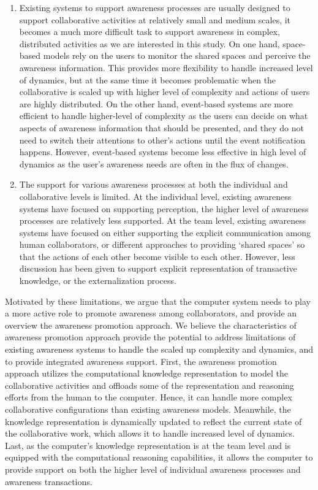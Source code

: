 \begin{enumerate}
   \item Existing systems to support awareness processes are usually designed to support collaborative activities at relatively small and medium scales, it becomes a much more difficult task to support awareness in complex, distributed activities as we are interested in this study. On one hand, space-based models rely on the users to monitor the shared spaces and perceive the awareness information. This provides more flexibility to handle increased level of dynamics, but at the same time it becomes  problematic when the collaborative is scaled up with higher level of complexity and actions of users are highly distributed. On the other hand, event-based systems are more efficient to handle higher-level of complexity as the users can decide on what aspects of awareness information that should be presented, and they do not need to switch their attentions to other's actions until the event notification happens. However, event-based systems become less effective in high level of dynamics as the user's awareness needs are often in the flux of changes.
   \item The support for various awareness processes at both the individual and collaborative levels is limited. At the individual level, existing awareness systems have focused on supporting perception, the higher level of awareness processes are relatively less supported. At the team level, existing awareness systems have focused on either supporting the explicit communication among human collaborators, or different approaches to providing `shared spaces' so that the actions of each other become visible to each other. However, less discussion has been given to support explicit representation of transactive knowledge, or the externalization process.
\end{enumerate}

Motivated by these limitations, we argue that the computer system needs to play a more active role to promote awareness among collaborators, and provide an overview the awareness promotion approach. We believe the characteristics of awareness promotion approach provide the potential to address limitations of existing awareness systems to handle the scaled up complexity and dynamics, and to provide integrated awareness support. First, the awareness promotion approach utilizes the computational knowledge representation to model the collaborative activities and offloads some of the representation and reasoning efforts from the human to the computer. Hence, it can  handle more complex collaborative configurations than existing awareness models. Meanwhile, the knowledge representation is dynamically updated to reflect the current state of the collaborative work, which allows it to handle increased level of dynamics. Last, as the computer's knowledge representation is at the team level and is equipped with the computational reasoning capabilities, it allows the computer to provide support on both the higher level of individual awareness processes and awareness transactions.

